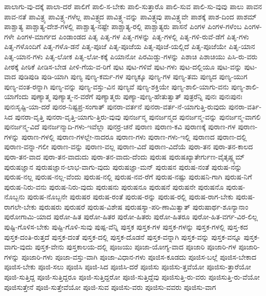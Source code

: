 {ಪಾಲಾಗು-ವು-ದಕ್ಕೆ
ಪಾಲಾ-ದರೆ
ಪಾಲಿಗೆ
ಪಾಲಿ-ಸ-ಬೇಕು
ಪಾಲಿ-ಸುತ್ತಾರೊ
ಪಾಲಿ-ಸುವ
ಪಾಲಿ-ಸು-ವುವು
ಪಾಲು
ಪಾವನ
ಪಾವ-ನತೆ
ಪಾವಿತ್ರ್ಯ
ಪಾವಿತ್ರ್ಯ-ಗಳೆಲ್ಲ
ಪಾವಿತ್ರ್ಯದ
ಪಾವಿತ್ರ್ಯ-ವನ್ನು
ಪಾವಿತ್ರ್ಯವು
ಪಾವಿತ್ರ್ಯವೇ
ಪಾಶಕ್ಕೆ
ಪಾಶ-ದಿಂದ
ಪಾಶಮ್
ಪಾಶ್ಚಾತ್ಯ
ಪಾಶ್ಚಾತ್ಯ-ದೇಶ-ಗಳಲ್ಲಿ
ಪಾಶ್ಚಾತ್ಯ-ನಷ್ಟೇ
ಪಾಶ್ಚಾತ್ಯ-ರಲ್ಲಿ
ಪಾಶ್ಚಾತ್ಯರು
ಪಾಸನೆ
ಪಿಂಗಳ
ಪಿಂಗಳ-ಗಳೆಂಬ
ಪಿಂಗಳ-ಗಳೇ
ಪಿಂಗಳ-ಮಾರ್ಗದ
ಪಿಂಡಾಂಡದ
ಪಿತೃ
ಪಿತೃ-ಗಳ
ಪಿತೃ-ಗಳನ್ನು
ಪಿತೃ-ಗಳಲ್ಲಿ
ಪಿತೃ-ಗಳಿ-ರುವೆ-ಡೆಗೆ
ಪಿತೃ-ಗಳು
ಪಿತೃ-ಗಳೊಂದಿಗೆ
ಪಿತೃ-ಗಳೊ-ಡನೆ
ಪಿತೃ-ಪೂಜೆ
ಪಿತೃ-ಪೂಜೆಯ
ಪಿತೃ-ಪೂಜೆ-ಯಲ್ಲಿದೆ
ಪಿತೃ-ಪೂಜೆಯೇ
ಪಿತೃ-ಯಾನ
ಪಿತೃ-ಯಾನ-ಗಳು
ಪಿತೃ-ಲೋಕ
ಪಿತೃ-ಲೋ-ಕಕ್ಕೆ
ಪಿಯಾನೋ
ಪಿರಮಿಡ್ಡು-ಗಳನ್ನು
ಪಿಶಾಚಿ
ಪಿಶಾಚಿಯು
ಪಿಸಿ-ರು-ವರು
ಪೀಠಕ್ಕೆ
ಪೀಠಿಕೆ
ಪೀಡಿಸ-ಬೇಡ
ಪೀಳಿ-ಗೆಯ-ವ-ರಿಗೆ
ಪುಟ
ಪುಟ-ಗಳಿವೆ
ಪುಟ-ಗಳು
ಪುಟ-ದಲ್ಲಿಯೂ
ಪುಟ-ವನ್ನು
ಪುಟ-ವಾದ
ಪುಡಿಪುಡಿ
ಪುಡಿ-ಯಾಗಿ
ಪುಣ್ಯ
ಪುಣ್ಯ-ಕರ್ಮ-ಗಳ
ಪುಣ್ಯಕ್ಕೂ
ಪುಣ್ಯ-ಗಳ
ಪುಣ್ಯ-ತಮ
ಪುಣ್ಯದ
ಪುಣ್ಯ-ಯುಗ
ಪುಣ್ಯ-ವಂತ-ರನ್ನಾಗಿ
ಪುಣ್ಯ-ವನ್ನು
ಪುಣ್ಯ-ವಸ್ತು-ವಿನ
ಪುಣ್ಯವೆ
ಪುಣ್ಯ-ಶಕ್ತಿಯೇ
ಪುಣ್ಯ-ಶಾಲಿ-ಯಾಗು-ವನು
ಪುಣ್ಯ-ಶಾಲಿ-ಯಾಗೆಂದು
ಪುಣ್ಯಾತ್ಮ
ಪುಣ್ಯಾತ್ಮ-ನ-ವರೆಗೆ
ಪುಣ್ಯಾತ್ಮರು
ಪುಣ್ಯಾ-ಪುಣ್ಯ-ಹೇತುತ್ವಾತ್
ಪುತ್ರರೆನ್ನಿ
ಪುನಃ
ಪುನಃಪುನಃ
ಪುನಃಸೃಷ್ಟಿ-ಯಾ-ದರೆ
ಪುನರ-ನಿಷ್ಟಪ್ರ-ಸಂಗಾತ್
ಪುನರಾ-ವರ್ತನೆ
ಪುನರಾ-ವರ್ತ-ನೆ-ಯಾಗುತ್ತಿ-ರುವುದು
ಪುನರಾ-ವರ್ತಿ-ಸಿದ
ಪುನರಾ-ವೃತ್ತಿ
ಪುನರಾ-ವೃತ್ತಿ-ಯಾಗು-ತ್ತಿರು-ವುವು
ಪುನರ್ಜನ್ಮ
ಪುನರ್ಜನ್ಮದ
ಪುನರ್ಜನ್ಮ-ವನ್ನು
ಪುನರ್ಜನ್ಮ-ವಾಗಲಿ
ಪುನರ್ಜನ್ಮ-ವಿದೆ
ಪುನರ್ಜನ್ಮಾದಿ-ಗಳು-ಇವೆಲ್ಲಾ
ಪುನರ್ರ-ಚನೆ
ಪುರಾಣ
ಪುರಾಣ-ಕವಿ
ಪುರಾಣಕ್ಕೆ
ಪುರಾಣ-ಗಳ
ಪುರಾಣ-ಗಳನ್ನು
ಪುರಾಣ-ಗಳಲ್ಲಿ
ಪುರಾಣ-ಗಳಲ್ಲೇ-ನಾದರೂ
ಪುರಾಣ-ಗಳು
ಪುರಾಣ-ಗಳು-ಇಲ್ಲಿ
ಪುರಾಣದ
ಪುರಾಣ-ದಲ್ಲಿ
ಪುರಾಣ-ವನ್ನಾ-ಗಲೀ
ಪುರಾಣ-ವನ್ನು
ಪುರಾಣ-ವಲ್ಲ
ಪುರಾಣ-ವಿದೆ
ಪುರಾಣ-ವಿದೆಯೆ
ಪುರಾ-ತನ
ಪುರಾ-ತನ-ಕಾಲದ
ಪುರಾ-ತನ-ವಾದ
ಪುರಾ-ತನ-ವಾದುದು
ಪುರಾ-ತನ-ವಾದು-ದೆಂದು
ಪುರುಷ
ಪುರುಷಖ್ಯಾತೇರ್ಗುಣ-ವೈತೃಷ್ಣ್ಯಮ್
ಪುರುಷಜ್ಞಾನ
ಪುರುಷಜ್ಞಾನ-ಲಾಭ-ವಾಗು-ವುದು
ಪುರುಷಜ್ಞಾ-ಮನ್
ಪುರುಷನ
ಪುರುಷ-ನಂತೆ
ಪುರುಷ-ನನ್ನು
ಪುರುಷ-ನಲ್ಲ
ಪುರುಷ-ನಲ್ಲ-ವೆಂದು
ಪುರುಷ-ನಲ್ಲಿ
ಪುರುಷ-ನವ-ರೆಗೆ
ಪುರುಷ-ನಷ್ಟು
ಪುರುಷನಿ-ಗಾಗಿ
ಪುರುಷ-ನಿಗೆ
ಪುರುಷ-ನಿರು-ವನು
ಪುರುಷ-ನಿರು-ವುದು
ಪುರುಷನು
ಪುರುಷನೂ
ಪುರುಷನೆ
ಪುರುಷನೇ
ಪುರುಷನೊ
ಪುರುಷ-ನೊಬ್ಬನು
ಪುರುಷ-ನೊಬ್ಬನೇ
ಪುರುಷರ
ಪುರುಷ-ರಂತೆ
ಪುರುಷ-ರನ್ನು
ಪುರುಷ-ರಲ್ಲಿ
ಪುರುಷ-ರಾಗ-ಬೇಕು
ಪುರುಷ-ರಾಗಲೇ-ಬೇಕು
ಪುರುಷರು
ಪುರುಷರೆ
ಪುರುಷ-ವಿಶೇಷ
ಪುರುಷಸ್ಯಾ-ಪರಿ-ಣಾಮಿತ್ವಾತ್
ಪುರುಷಾರ್ಥ-ಶೂನ್ಯಾನಾಂ
ಪುರೋಗಾಮಿ-ಯಾದ
ಪುರೋ-ಹಿತ
ಪುರೋ-ಹಿತರ
ಪುರೋ-ಹಿತರು
ಪುರೋ-ಹಿತರೂ
ಪುರೋ-ಹಿತ-ವರ್ಗ-ವಿರ-ಲಿಲ್ಲ
ಪುಷ್ಟಿ-ಗೊಳಿಸ-ಬೇಕು
ಪುಷ್ಟಿ-ಗೊಳಿ-ಸುವು
ಪುಷ್ಪ-ವೆನ್ನಿ
ಪುಸ್ತಕ
ಪುಸ್ತಕ-ಗಳ
ಪುಸ್ತಕ-ಗಳನ್ನು
ಪುಸ್ತಕ-ಗಳಲ್ಲಿ
ಪುಸ್ತ-ಕದ
ಪುಸ್ತಕ-ದಂತಿ-ರುತ್ತದೆ
ಪುಸ್ತಕ-ದಂತೆ
ಪುಸ್ತಕ-ದಲ್ಲಿ
ಪುಸ್ತಕ-ದೊಡನೆ
ಪುಸ್ತಕ-ವನ್ನಾಗಿ
ಪುಸ್ತಕ-ವನ್ನು
ಪುಸ್ತಕ-ವನ್ನೂ
ಪುಸ್ತಕ-ವಾಗು-ವುದು
ಪುಸ್ತಕ-ವೇನು
ಪುಸ್ತಕಾಲಯ-ದಲ್ಲಿ
ಪೂಜಯು
ಪೂಜಾ-ಯೋಗ್ಯ-ವಾದ
ಪೂಜಾರಿ
ಪೂಜಾರಿ-ಗಳ
ಪೂಜಾರಿ-ಗಳನ್ನು
ಪೂಜಾರಿ-ಗಳು
ಪೂಜಾ-ವಸ್ತು-ವಾಗಿ
ಪೂಜಾ-ವಿಧಾನ-ಗಳು
ಪೂಜಿಸ-ಕೂಡದು
ಪೂಜಿಸ-ಬಲ್ಲೆ
ಪೂಜಿಸ-ಬೇಕಾದ
ಪೂಜಿಸ-ಬೇಕು
ಪೂಜಿ-ಸಲು
ಪೂಜಿಸಿ
ಪೂಜಿ-ಸಿದ
ಪೂಜಿಸಿ-ದರೆ
ಪೂಜಿಸು
ಪೂಜಿಸು-ತ್ತವೆಯೋ
ಪೂಜಿಸು-ತ್ತಾರೆಯೋ
ಪೂಜಿ-ಸುತ್ತಿದ್ದ
ಪೂಜಿ-ಸುತ್ತಿದ್ದರೂ
ಪೂಜಿ-ಸುತ್ತಿದ್ದರೋ
ಪೂಜಿ-ಸುತ್ತಿದ್ದೆವು
ಪೂಜಿಸುತ್ತಿ-ರು-ವರು
ಪೂಜಿಸುತ್ತಿ-ರು-ವೆಯೋ
ಪೂಜಿಸುತ್ತೇನೆ
ಪೂಜಿ-ಸುತ್ತೇವೆಯೋ
ಪೂಜಿ-ಸುವ
ಪೂಜಿಸು-ವರು
ಪೂಜಿಸು-ವವರು
ಪೂಜಿಸು-ವಾಗ
}
